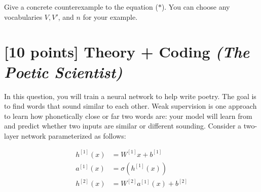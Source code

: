 \documentclass{article}
\newif\ifsolutions
\newenvironment{labelledanswer}{{\bf Answer:} \sf }{}%
\newcommand{\answer}[2]
{{
\ifsolutions
\begin{labelledanswer}
\color{red} 
#2
\end{labelledanswer}
\else
#1
\fi
}}
\begin{document}
\begin{itemize}
    Give a concrete counterexample to the equation ($*$). You can choose any vocabularies $V, V'$, and $n$ for your example.
    
    \answer{}{
    $$
    f_{V, n}(S_t) = y\left(\text{arg} \max_{S_i \in \mathcal{S}_{\text{train}}}  K_{V, n}(S_i, S_t)\right)
    $$
    $$
    f_{V', n}(S_t) = y\left(\text{arg} \max_{S_i \in \mathcal{S}_{\text{train}}}  K_{V', n}(S_i, S_t)\right)
    $$
    We want to give counte example to: 
    $$
    y\left(\text{arg} \max_{S_i \in \mathcal{S}_{\text{train}}}  K_{V, n}(S_i, S_t)\right) = y\left(\text{arg} \max_{S_i \in \mathcal{S}_{\text{train}}}  K_{V', n}(S_i, S_t)\right)
    $$
    Let's choose an example where $n = 1$, which means that we're just counting common word between two string for the kernel. Then let's take $V$ to be all the words in the English dictionary, while $V'=\{\text{UNK}\}$, effectively reduce the vocab to 1 words. It's easy to see here that for any string that's actually the same, meaning $y=1$, $V'$ will map that to just {UNK}, making the maximum count of common to be 1 (since we also don't extract multiple same copy from the prompt). 
Let's say we have 2 string to train with $S_1$=("A B C") and $S_2$=("A B B C D"). For $V$, we have 1-gram \{"A", "B", "C"\} and \{"A", "B", "C", "D"\}. For $V'$, we have 1-gram \{UNK\}.
$$
    f_{V, n}(S_1) = y\left(\text{arg} \max_{S_i \in \mathcal{S}_{\text{train}}}  K_{V, n}(S_i, S_1)\right) = y (3)
$$
$$
    f_{V', n}(S_1) = y\left(\text{arg} \max_{S_i \in \mathcal{S}_{\text{train}}}  K_{V', n}(S_i, S_1)\right) = y (1)
$$
$$
 \implies f_{V', n}(S_t) \neq f_{V, n}(S_t)
$$
    
    
    }
    
\end{itemize} 

\clearpage 

\section{[10 points] Theory + Coding  \it{(The Poetic Scientist)}}

In this question, you will train a neural network to help write poetry. The goal is to find words that sound similar to each other. Weak supervision is one approach to learn how phonetically close or far two words are: your model will learn from and predict whether two inputs are similar or different sounding. Consider a two-layer network parameterized as follows:

\begin{align}
    h^{[1]}(x) &= W^{[1]}x + b^{[1]}\\
    a^{[1]}(x) &= \sigma(h^{[1]}(x))\\
    h^{[2]}(x) &= W^{[2]}a^{[1]}(x) + b^{[2]}
\end{align}
\end{document}
